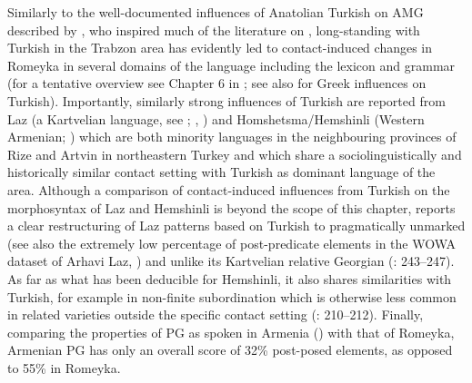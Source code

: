 \documentclass[output=paper,colorlinks,citecolor=brown]{langscibook}
\begin{document}
\begin{sloppypar}
Similarly to the well-documented influences of Anatolian Turkish on AMG described by \citet{dawkins1916}, who inspired much of the literature on , long-standing  with Turkish in the Trabzon area has evidently led to contact-induced changes in Romeyka in several domains of the language including the lexicon and grammar (for a tentative overview see Chapter 6 in \citealt{schreibergrammar2022}; see also \citealt{brendemoen1998,brendemoen1999,brendemoen2002,brendemoen2005,brendemoen2006,brendemoen2010,brendemoen2019} for Greek influences on Turkish). Importantly, similarly strong influences of Turkish are reported from Laz (a Kartvelian language, see \citealt{kutscher2008}; \citealt{lacroix_laz_2018,lacroix_description_2009}, \citealt{ozturkpochtrager2011}) and Homshetsma/Hemshinli (Western Armenian; \citealt{vaux2007}) which are both minority languages in the neighbouring provinces of Rize and Artvin in northeastern Turkey and which share a sociolinguistically and historically similar contact setting with Turkish as dominant language of the area. Although a comparison of contact-induced influences from Turkish on the morphosyntax of Laz and Hemshinli is beyond the scope of this chapter, \citet[282--284]{neocleous_word_2020} reports a clear restructuring of Laz  patterns based on Turkish to pragmatically unmarked   (see also the extremely low percentage of post-predicate elements in the WOWA dataset of Arhavi Laz, \citealt{stilo_laz_2021}) and unlike its Kartvelian relative Georgian (\citealt{neocleous_word_2020}: 243--247). As far as what has been deducible for Hemshinli, it also shares similarities with Turkish, for example in non-finite subordination which is otherwise less common in related varieties outside the specific contact setting (\citealt{gandon2016}: 210--212). Finally, comparing the  properties of PG as spoken in Armenia (\citealt{hodgson_pontic_nodate}) with that of Romeyka, Armenian PG has only an overall score of 32\% post-posed elements, as opposed to 55\% in Romeyka.
\end{sloppypar}
\end{document}
